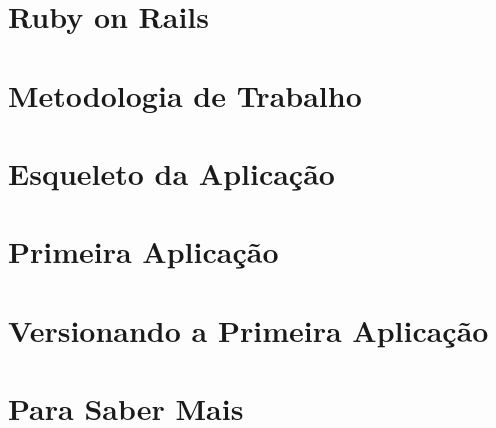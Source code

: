 \documentclass[t, 				             
			   final,
			   12pt, 				         
			   xcolor={usenames,dvipsnames}, 
			   table]{beamer}
\begin{document}
	
	
	  	
    
    \section{Ruby on Rails}
		
	
    
    \section{Metodologia de Trabalho}
    

    \section{Esqueleto da Aplicação}
    
   
    \section{Primeira Aplicação}
    
    
    

    \section{Versionando a Primeira Aplicação}
    
        
    
    \section{Para Saber Mais}
	
\end{document}
